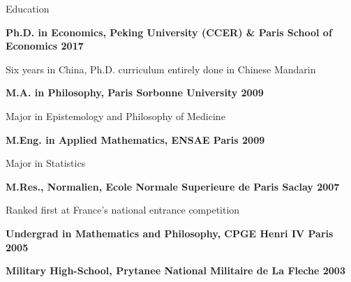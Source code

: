 \documentclass[usegeometry, 10pt, a4paper]{cv} %
\newcommand{\activite}[1]{\textbf{#1}\ }
\newenvironment{normal-itemize}{
\begin{itemize}
     \setlength{\itemsep}{1.3mm}
     \setlength{\parskip}{0pt}
     \setlength{\parsep}{0pt}}
{\end{itemize}
}
\begin{document}
\begin{rubriquetableau}[0.95\textwidth]{Education}\\
\vspace{-0.6cm}

\activite{Ph.D. in Economics, Peking University (CCER) \& Paris School of Economics \hfill 2017}\\
\vspace{-0.4cm}
\renewcommand\labelitemi{}
\begin{normal-itemize}
\small
\vspace{-0.3cm}
\item Six years in China, Ph.D. curriculum entirely done in Chinese Mandarin
\end{normal-itemize}
\vspace{0.2cm}

\activite{M.A. in Philosophy, Paris Sorbonne University \hfill 2009}\\
\vspace{-0.2cm}
\renewcommand\labelitemi{}
\begin{normal-itemize}
\small
\vspace{-0.3cm}
\item Major in Epistemology and Philosophy of Medicine
\end{normal-itemize}
\vspace{0.2cm}

\activite{M.Eng. in Applied Mathematics, ENSAE Paris \hfill 2009}\\
\vspace{-0.2cm}
\renewcommand\labelitemi{}
\begin{normal-itemize}
\small
\vspace{-0.3cm}
\item Major in Statistics
\end{normal-itemize}
\vspace{0.2cm}

\activite{M.Res., Normalien, Ecole Normale Superieure de Paris Saclay \hfill 2007}\\
\vspace{-0.2cm}
\renewcommand\labelitemi{}
\begin{normal-itemize}
\small
\vspace{-0.3cm}
\item Ranked first at France's national entrance competition 
\end{normal-itemize}
\vspace{0.2cm}

\activite{Undergrad in Mathematics and Philosophy, CPGE Henri IV Paris \hfill
  2005}\\
\vspace{0.2cm}

\activite{Military High-School, Prytanee National Militaire de La Fleche \hfill 2003}\\
\vspace{0.2cm}

\normalsize
\end{rubriquetableau}
\end{document}
